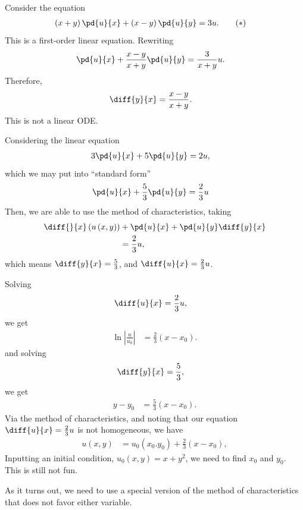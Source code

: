 \documentclass[10pt]{mypackage}
\begin{document}
\begin{example}
  Consider the equation
  \begin{align*}
    \left( x+y \right)\pd{u}{x} + \left( x-y \right)\pd{u}{y} &= 3u.\label{eq:hard_pde}\tag{\textasteriskcentered}
  \end{align*}
  This is a first-order linear equation. Rewriting
  \begin{align*}
    \pd{u}{x} + \frac{x-y}{x+y}\pd{u}{y} &= \frac{3}{x+y} u.
  \end{align*}
  Therefore,
  \begin{align*}
    \diff{y}{x} &= \frac{x-y}{x+y}.
  \end{align*}
  This is not a linear ODE.\newline

  Considering the linear equation
  \begin{align*}
    3\pd{u}{x} + 5\pd{u}{y} &= 2u,
  \end{align*}
  which we may put into ``standard form''
  \begin{align*}
    \pd{u}{x} + \frac{5}{3}\pd{u}{y} &= \frac{2}{3}u
  \end{align*}
  Then, we are able to use the method of characteristics, taking
  \begin{align*}
    \diff{}{x}\left( u\left( x,y \right) \right) &+ \pd{u}{x} + \pd{u}{y}\diff{y}{x}\\
                                                 &= \frac{2}{3}u,
  \end{align*}
  which means $\diff{y}{x} = \frac{5}{3}$, and $\diff{u}{x} = \frac{2}{3}u$. \newline

  Solving
  \begin{align*}
    \diff{u}{x} &= \frac{2}{3}u,
  \end{align*}
  we get
  \begin{align*}
    \ln\left\vert \frac{u}{u_0} \right\vert &= \frac{2}{3}\left( x-x_0 \right).
  \end{align*}
  and solving
  \begin{align*}
    \diff{y}{x} &= \frac{5}{3},
  \end{align*}
  we get
  \begin{align*}
    y-y_0 &= \frac{5}{3}\left( x-x_0 \right).
  \end{align*}
  Via the method of characteristics, and noting that our equation $\diff{u}{x} = \frac{2}{3}u$ is not homogeneous, we have
  \begin{align*}
    u\left( x,y \right) &= u_0\left( x_0.y_0 \right) + \frac{2}{3}\left( x-x_0 \right),
  \end{align*}
  Inputting an initial condition, $u_0\left( x,y \right) = x + y^2$, we need to find $x_0$ and $y_0$. This is still not fun.\newline

  As it turns out, we need to use a special version of the method of characteristics that does not favor either variable.
\end{example}
\end{document}
